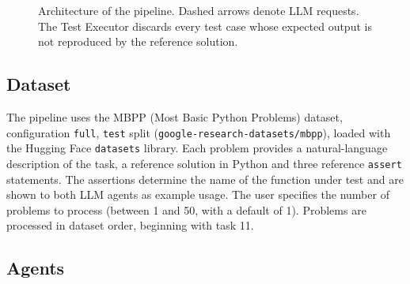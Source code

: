\documentclass[11pt, a4paper]{article}
\newcommand{\breakpath}[1]{\nolinkurl{#1}}
\begin{document}
\begin{figure}[H]
    \caption{Architecture of the pipeline. Dashed arrows denote LLM requests. The Test Executor discards every test case whose expected output is not reproduced by the reference solution.}
    \label{fig:pipeline}
\end{figure}

\subsection{Dataset}

The pipeline uses the MBPP (Most Basic Python Problems) dataset, configuration \texttt{full}, \texttt{test} split (\breakpath{google-research-datasets/mbpp}), loaded with the Hugging Face \texttt{datasets} library. Each problem provides a natural-language description of the task, a reference solution in Python and three reference \texttt{assert} statements. The assertions determine the name of the function under test and are shown to both LLM agents as example usage. The user specifies the number of problems to process (between 1 and 50, with a default of 1). Problems are processed in dataset order, beginning with task 11.

\subsection{Agents}
\end{document}
